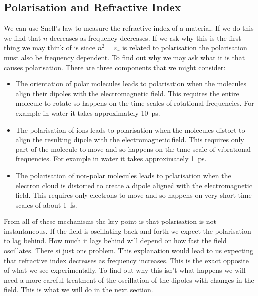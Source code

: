    \subsection{Polarisation and Refractive Index}
    We can use Snell's law to measure the refractive index of a material.
    If we do this we find that \(n\) decreases as frequency decreases.
    If we ask why this is the first thing we may think of is since \(n^2 = \varepsilon_r\) is related to polarisation the polarisation must also be frequency dependent.
    To find out why we may ask what it is that causes polarisation.
    There are three components that we might consider:
    \begin{itemize}
        \item The orientation of polar molecules leads to polarisation when the molecules align their dipoles with the electromagnetic field.
        This requires the entire molecule to rotate so happens on the time scales of rotational frequencies.
        For example in water it takes approximately \SI{10}{\pico\second}.
        \item The polarisation of ions leads to polarisation when the molecules distort to align the resulting dipole with the electromagnetic field.
        This requires only part of the molecule to move and so happens on the time scale of vibrational frequencies.
        For example in water it takes approximately \SI{1}{\pico\second}.
        \item The polarisation of non-polar molecules leads to polarisation when the electron cloud is distorted to create a dipole aligned with the electromagnetic field.
        This requires only electrons to move and so happens on very short time scales of about \SI{1}{\femto\second}.
    \end{itemize}
    From all of these mechanisms the key point is that polarisation is not instantaneous.
    If the field is oscillating back and forth we expect the polarisation to lag behind.
    How much it lags behind will depend on how fast the field oscillates.
    There si just one problem.
    This explanation would lead to us expecting that refractive index decreases as frequency increases.
    This is the exact opposite of what we see experimentally.
    To find out why this isn't what happens we will need a more careful treatment of the oscillation of the dipoles with changes in the field.
    This is what we will do in the next section.
    
